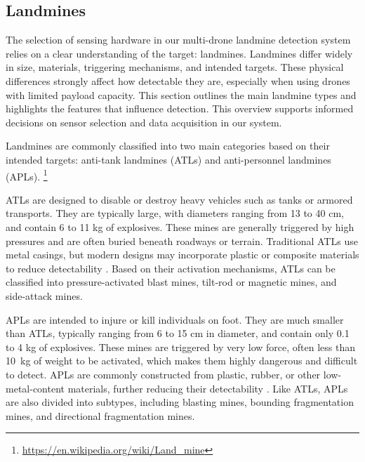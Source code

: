 \subsection{Landmines}

The selection of sensing hardware in our multi-drone landmine detection system relies on a clear understanding of the target: landmines. Landmines differ widely in size, materials, triggering mechanisms, and intended targets. These physical differences strongly affect how detectable they are, especially when using drones with limited payload capacity. This section outlines the main landmine types and highlights the features that influence detection. This overview supports informed decisions on sensor selection and data acquisition in our system.

Landmines are commonly classified into two main categories based on their intended targets: anti-tank landmines (ATLs) and anti-personnel landmines (APLs).
\footnote{\url{https://en.wikipedia.org/wiki/Land_mine}}

ATLs are designed to disable or destroy heavy vehicles such as tanks or armored transports. They are typically large, with diameters ranging from 13 to 40 cm, and contain 6 to 11 kg of explosives\cite{paik2002image}. These mines are generally triggered by high pressures and are often buried beneath roadways or terrain. Traditional ATLs use metal casings, but modern designs may incorporate plastic or composite materials to reduce detectability \cite{evans2024detection}. Based on their activation mechanisms, ATLs can be classified into pressure-activated blast mines, tilt-rod or magnetic mines, and side-attack mines.

APLs are intended to injure or kill individuals on foot. They are much smaller than ATLs, typically ranging from 6 to 15 cm in diameter, and contain only 0.1 to 4 kg of explosives\cite{paik2002image}. These mines are triggered by very low force, often less than 10~kg of weight to be activated, which makes them highly dangerous and difficult to detect. APLs are commonly constructed from plastic, rubber, or other low-metal-content materials, further reducing their detectability \cite{kaya2017buried}. Like ATLs, APLs are also divided into subtypes, including blasting mines, bounding fragmentation mines, and directional fragmentation mines.

